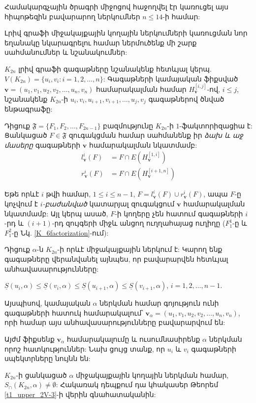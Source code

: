 Համակարգչային ծրագրի միջոցով հաջողվել էր կառուցել այս հիպոթեզին բավարարող ներկումներ $n \leq 14$-ի համար:
 
Լրիվ գրաֆի միջակայքային կողային ներկումների կառուցման նոր եղանակը նկարագրելու համար ներմուծենք մի շարք սահմանումներ և նշանակումներ:

$K_{2n}$ լրիվ գրաֆի գագաթները նշանակենք հետևյալ կերպ. $V(K_{2n}) = \{u_i, v_i : i=1,2,\ldots,n\}$: Գագաթների կամայական ֆիքսված $\mathbf{v} = \left(u_1,v_1, u_2,v_2, \ldots,u_n,v_n\right)$ համարակալման համար $H_{\mathbf{v}}^{[i,j]}$-ով, $i \leq j$, նշանակենք $K_{2n}$-ի $u_i, v_i, u_{i+1}, v_{i+1}, \ldots, u_j, v_j$ գագաթներով ծնված ենթագրաֆը: 

Դիցուք $\mathfrak{F} = \{F_1, F_2, \ldots, F_{2n-1}\}$ բազմությունը $K_{2n}$-ի $1$-ֆակտորիզացիա է: Ցանկացած $F\in \mathfrak{F}$ զուգակցման համար սահմանենք իր \textit{ձախ և աջ մասերը} գագաթների $\mathbf{v}$ համարակալման նկատմամբ:
\begin{align*}
l_{\mathbf{v}}^i(F) &= F \cap E\left(H_{\mathbf{v}}^{[1,i]}\right)\\
r_{\mathbf{v}}^i(F) &= F \cap E\left(H_{\mathbf{v}}^{[i+1,n]}\right)
\end{align*}

Եթե որևէ $i$ թվի համար, $1 \leq i \leq n-1$, $F = l_{\mathbf{v}}^i(F) \cup r_{\mathbf{v}}^i(F)$, ապա $F$-ը կոչվում է \textit{$i$-բաժանված} կատարյալ զուգակցում $\mathbf{v}$ համարակալման նկատմամբ: Այլ կերպ ասած, $F$-ի կողերը չեն հատում գագաթների $i$-րդ և $(i+1)$-րդ զույգերի միջև անցող ուղղահայաց ուղիղը ($F_1^1$-ը և $F_1^2$-ը Նկ. \ref{K_6factorization}-ում):

Դիցուք $\alpha$-ն $K_{2n}$-ի որևէ միջակայքային ներկում է: Կարող ենք գագաթները վերանվանել այնպես, որ բավարարվեն հետևյալ անհավասարությունները: 
\begin{center}
$\underline{S}(u_i, \alpha) \leq \underline{S}(v_i, \alpha) \leq \underline{S}(u_{i+1}, \alpha)\leq \underline{S}(v_{i+1}, \alpha)$, $i=1,2,\ldots,n-1$.
\end{center}
Այսպիսով, կամայական $\alpha$ ներկման համար գոյություն ունի գագաթների հատուկ համարակալում՝ $\mathbf{v}_\alpha = \left(u_1,v_1, u_2,v_2, \ldots,u_n,v_n\right)$, որի համար այս անհավասարությունները բավարարվում են: 

Այժմ ֆիքսենք $\mathbf{v}_\alpha$ համարակալումը և ուսումնասիրենք $\alpha$ ներկման որոշ հատկություններ: Նախ ցույց տանք, որ $u_i$ և $v_i$ գագաթների սպեկտրները նույնն են:

\begin{remark}
\label{spectrumIntersection}
$K_{2n}$-ի ցանկացած $\alpha$ միջակայքային կողային ներկման համար, $S_\cap\left(K_{2n}, \alpha\right) \neq \emptyset$: Հակառակ դեպքում դա կհակասեր Թեորեմ \ref{t1_upper_2V-3}-ի վերին գնահատականին:
\end{remark}

